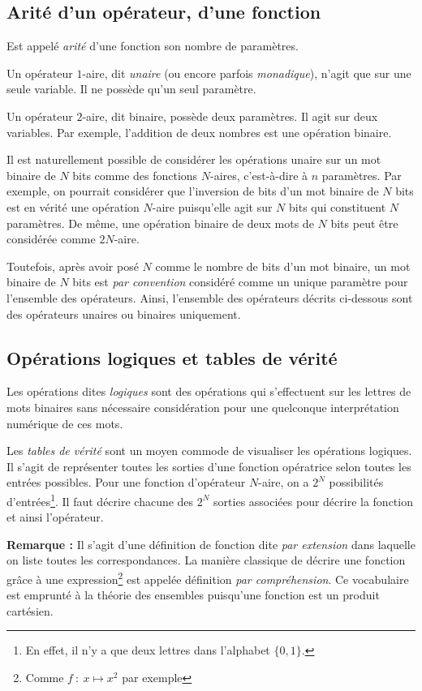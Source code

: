 \documentclass[../../main.tex]{subfiles}
\begin{document}
\subsection{Arité d'un opérateur, d'une fonction}
\label{sub:arit_d_un_op_rateur_d_une_fonction}
Est appelé \textit{arité} d'une fonction son nombre de paramètres.

Un opérateur $1$-aire, dit \textit{unaire} (ou encore parfois \textit{monadique}), n'agit que sur une seule variable. Il ne possède qu'un seul paramètre.

Un opérateur $2$-aire, dit binaire, possède deux paramètres. Il agit sur deux variables. Par exemple, l'addition de deux nombres est une opération binaire.

Il est naturellement possible de considérer les opérations unaire sur un mot binaire de $N$ bits comme des fonctions $N$-aires, c'est-à-dire à $n$ paramètres. Par exemple, on pourrait considérer que l'inversion de bits d'un mot binaire de $N$ bits est en vérité une opération $N$-aire puisqu'elle agit sur $N$ bits qui constituent $N$ paramètres. De même, une opération binaire de deux mots de $N$ bits peut être considérée comme $2N$-aire.

Toutefois, après avoir posé $N$ comme le nombre de bits d'un mot binaire, un mot binaire de $N$ bits est \textit{par convention} considéré comme un unique paramètre pour l'ensemble des opérateurs. Ainsi, l'ensemble des opérateurs décrits ci-dessous sont des opérateurs unaires ou binaires uniquement.
\subsection{Opérations logiques et tables de vérité}
\label{sub:op_rations_logiques_et_tables_de_v_rit_}
Les opérations dites \textit{logiques} sont des opérations qui s'effectuent sur les lettres de mots binaires sans nécessaire considération pour une quelconque interprétation numérique de ces mots.

Les \textit{tables de vérité} sont un moyen commode de visualiser les opérations logiques. Il s'agit de représenter toutes les sorties d'une fonction opératrice selon toutes les entrées possibles. Pour une fonction d'opérateur $N$-aire, on a $2^{N}$ possibilités d'entrées\footnote{En effet, il n'y a que deux lettres dans l'alphabet $\{0, 1\}$.}. Il faut décrire chacune des $2^{N}$ sorties associées pour décrire la fonction et ainsi l'opérateur.

\textbf{Remarque :} Il s'agit d'une définition de fonction dite \textit{par extension} dans laquelle on liste toutes les correspondances. La manière classique de décrire une fonction grâce à une expression\footnote{Comme $f\ :\ x\mapsto{x^{2}}$ par exemple} est appelée définition \textit{par compréhension}. Ce vocabulaire est emprunté à la théorie des ensembles puisqu'une fonction est un produit cartésien.
\end{document}
